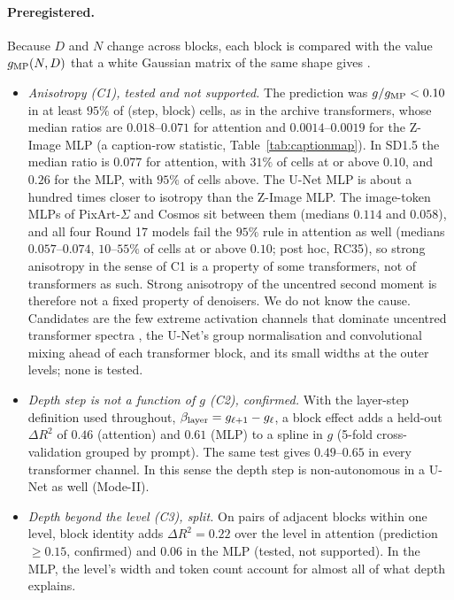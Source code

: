 \documentclass[11pt]{article}
\begin{document}
\paragraph{Preregistered.} Because $D$ and $N$ change across blocks, each block is compared with the value $g_{\rm MP}(N,D)$ that a white Gaussian matrix of the same shape gives \citep{marchenko1967distribution}.
\begin{itemize}
 \item \emph{Anisotropy (C1), tested and not supported.} The prediction was $g/g_{\rm MP}<0.10$ in at least $95\%$ of (step, block) cells, as in the archive transformers, whose median ratios are $0.018$--$0.071$ for attention and $0.0014$--$0.0019$ for the Z-Image MLP (a caption-row statistic, Table~\ref{tab:captionmap}). In SD1.5 the median ratio is $0.077$ for attention, with $31\%$ of cells at or above $0.10$, and $0.26$ for the MLP, with $95\%$ of cells above. The U-Net MLP is about a hundred times closer to isotropy than the Z-Image MLP. The image-token MLPs of PixArt-$\Sigma$ and Cosmos sit between them (medians $0.114$ and $0.058$), and all four Round 17 models fail the $95\%$ rule in attention as well (medians $0.057$--$0.074$, $10$--$55\%$ of cells at or above $0.10$; post hoc, RC35), so strong anisotropy in the sense of C1 is a property of some transformers, not of transformers as such. Strong anisotropy of the uncentred second moment is therefore not a fixed property of denoisers. We do not know the cause. Candidates are the few extreme activation channels that dominate uncentred transformer spectra \citep{sun2024massive}, the U-Net's group normalisation and convolutional mixing ahead of each transformer block, and its small widths at the outer levels; none is tested.
 \item \emph{Depth step is not a function of $g$ (C2), confirmed.} With the layer-step definition used throughout, $\beta_{\rm layer}=g_{\ell+1}-g_\ell$, a block effect adds a held-out $\Delta R^2$ of $0.46$ (attention) and $0.61$ (MLP) to a spline in $g$ (5-fold cross-validation grouped by prompt). The same test gives $0.49$--$0.65$ in every transformer channel. In this sense the depth step is non-autonomous in a U-Net as well (Mode-II).
 \item \emph{Depth beyond the level (C3), split.} On pairs of adjacent blocks within one level, block identity adds $\Delta R^2=0.22$ over the level in attention (prediction $\ge0.15$, confirmed) and $0.06$ in the MLP (tested, not supported). In the MLP, the level's width and token count account for almost all of what depth explains.
\end{itemize}
\end{document}
